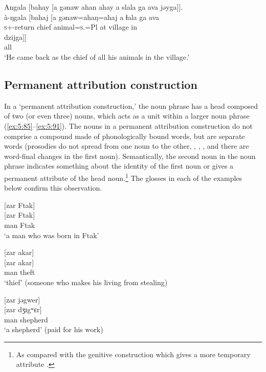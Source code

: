 \ea \label{ex:5:84}
Angala  [bahay  [a  gənaw  ahan  ahay  a  slala  ga  ava  jəyga]].\\
\gll  à-ŋgala     [bahaj  [a   gənaw=ahaŋ=ahaj  a  ɬala  ga  ava\\ 
      \textsc{s}+{\PFV}-return  chief  {\GEN}  animal=\textsc{s}.{\POSS}=Pl  at  village  {\ADJ}  in\\
      
      \medskip
\gll dzijga]]\\
     all\\
\glt  ‘He came back as the chief of all his animals in the village.’ 
\z

\subsection{Permanent attribution construction}\label{sec:5.4.2}
\hypertarget{RefHeading1211761525720847}{}
In a ‘permanent attribution construction,’ the noun phrase has a head composed of two (or even three) nouns, which acts as a unit within a larger noun phrase (\ref{ex:5:85}--\ref{ex:5:91}). The nouns in a permanent attribution construction do not comprise a compound made of phonologically bound words, but are separate words (prosodies do not spread from one noun to the other, , , , and there are word-final changes in the first noun). Semantically, the second noun in the noun phrase indicates something about the identity of the first noun or gives a permanent attribute of the head noun.\footnote{As compared with the genitive construction which gives a more temporary attribute .} The glosses in each of the examples below confirm this observation. 

\ea \label{ex:5:85}
{}[zar  Ftak]\\
\gll  {}[zar Ftak]\\
      man    Ftak\\
\glt  ‘a man who was born in Ftak’
\z

\ea \label{ex:5:86}
{}[zar  akar]\\
\gll  {}[zar    akar]\\
      man   theft\\
\glt  ‘thief’ (someone who makes his living from stealing)
\z

\ea \label{ex:5:87}
{}[zar  jəgwer]\\
\gll  {}[zar   dʒɪgʷɛr]\\
      man    shepherd\\
\glt  ‘a shepherd’ (paid for his work)
\z

